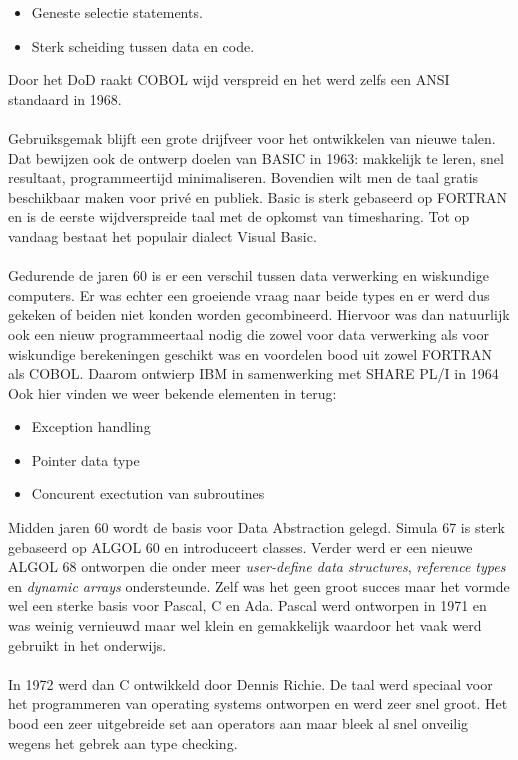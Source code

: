 \documentclass[../main.tex]{subfiles}
\begin{document}
\begin{solution}
\begin{itemize}
		\item Geneste selectie statements.
		\item Sterk scheiding tussen data en code.
\end{itemize}
Door het DoD raakt COBOL wijd verspreid en het werd zelfs een ANSI standaard in 1968.
\\\\
Gebruiksgemak blijft een grote drijfveer voor het ontwikkelen van nieuwe talen.
Dat bewijzen ook de ontwerp doelen van BASIC in 1963: makkelijk te leren, snel resultaat, programmeertijd minimaliseren.
Bovendien wilt men de taal gratis beschikbaar maken voor priv\'e en publiek.
Basic is sterk gebaseerd op FORTRAN en is de eerste wijdverspreide taal met de opkomst van timesharing. Tot op vandaag bestaat het populair dialect Visual Basic.
\\\\
Gedurende de jaren 60 is er een verschil tussen data verwerking en wiskundige computers.
Er was echter een groeiende vraag naar beide types en er werd dus gekeken of beiden niet konden worden gecombineerd.
Hiervoor was dan natuurlijk ook een nieuw programmeertaal nodig die zowel voor data verwerking als voor wiskundige berekeningen geschikt was en voordelen bood uit zowel FORTRAN als COBOL.
Daarom ontwierp IBM in samenwerking met SHARE PL/I in 1964
Ook hier vinden we weer bekende elementen in terug:
\begin{itemize}
	\item Exception handling
	\item Pointer data type
	\item Concurent exectution van subroutines
\end{itemize}
Midden jaren 60 wordt de basis voor Data Abstraction gelegd.
Simula 67 is sterk gebaseerd op ALGOL 60 en introduceert classes.
Verder werd er een nieuwe ALGOL 68 ontworpen die onder meer \emph{user-define data structures}, \emph{reference types} en \emph{dynamic arrays} ondersteunde.
Zelf was het geen groot succes maar het vormde wel een sterke basis voor Pascal, C en Ada.
Pascal werd ontworpen in 1971 en was weinig vernieuwd maar wel klein en gemakkelijk waardoor het vaak werd gebruikt in het onderwijs.
\\\\
In 1972 werd dan C ontwikkeld door Dennis Richie.
De taal werd speciaal voor het programmeren van operating systems ontworpen en werd zeer snel groot.
Het bood een zeer uitgebreide set aan operators aan maar bleek al snel onveilig wegens het gebrek aan type checking.

\end{solution}
\end{document}
